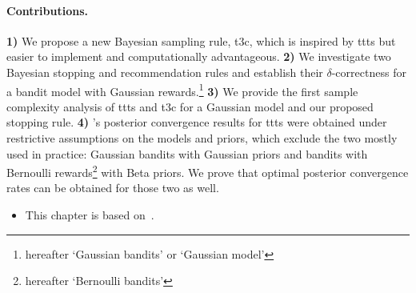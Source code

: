 % 


\paragraph{Contributions.} %
\textbf{1)}
We propose a new Bayesian sampling rule, \gls{t3c}, which is inspired by \gls{ttts} but easier to implement and computationally advantageous. 
\textbf{2)} We investigate two Bayesian stopping and recommendation rules and establish their $\delta$-correctness for a bandit model with Gaussian rewards.\footnote{hereafter `Gaussian bandits' or `Gaussian model'}
\textbf{3)}
We provide the first sample complexity analysis of \gls{ttts} and \gls{t3c} for a Gaussian model and our proposed stopping rule.
\textbf{4)} \citeauthor{russo2016ttts}'s posterior convergence results for \gls{ttts} were obtained under restrictive assumptions on the models and priors, which exclude the two mostly used in practice: Gaussian bandits with Gaussian priors and bandits with Bernoulli rewards\footnote{hereafter `Bernoulli bandits'} with Beta priors. We prove that optimal posterior convergence rates can be obtained for those two as well.

\medskip

\begin{itemize}[label=]
    \item This chapter is based on~\cite{shang2020t3c}.
\end{itemize}
